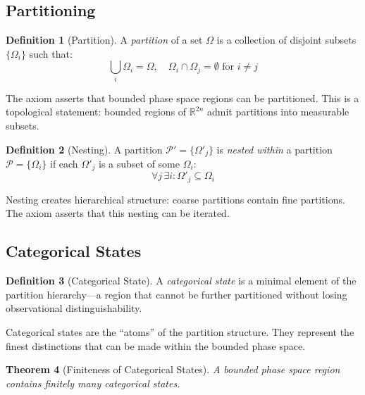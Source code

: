 \documentclass[twocolumn,10pt,a4paper]{article}
\newtheorem{theorem}{Theorem}[section]
\theoremstyle{definition}
\newtheorem{definition}[theorem]{Definition}
\theoremstyle{remark}
\newcommand{\Partition}{\mathcal{P}}
\begin{document}
\subsection{Partitioning}

\begin{definition}[Partition]
A \emph{partition} of a set $\Omega$ is a collection of disjoint subsets $\{\Omega_i\}$ such that:
\begin{equation}
    \bigcup_i \Omega_i = \Omega, \quad \Omega_i \cap \Omega_j = \emptyset \text{ for } i \neq j
\end{equation}
\end{definition}

The axiom asserts that bounded phase space regions can be partitioned. This is a topological statement: bounded regions of $\mathbb{R}^{2n}$ admit partitions into measurable subsets.

\begin{definition}[Nesting]
A partition $\Partition' = \{\Omega'_j\}$ is \emph{nested within} a partition $\Partition = \{\Omega_i\}$ if each $\Omega'_j$ is a subset of some $\Omega_i$:
\begin{equation}
    \forall j \, \exists i : \Omega'_j \subseteq \Omega_i
\end{equation}
\end{definition}

Nesting creates hierarchical structure: coarse partitions contain fine partitions. The axiom asserts that this nesting can be iterated.

\subsection{Categorical States}

\begin{definition}[Categorical State]
A \emph{categorical state} is a minimal element of the partition hierarchy---a region that cannot be further partitioned without losing observational distinguishability.
\end{definition}

Categorical states are the ``atoms'' of the partition structure. They represent the finest distinctions that can be made within the bounded phase space.

\begin{theorem}[Finiteness of Categorical States]
\label{thm:finiteness}
A bounded phase space region contains finitely many categorical states.
\end{theorem}
\end{document}
